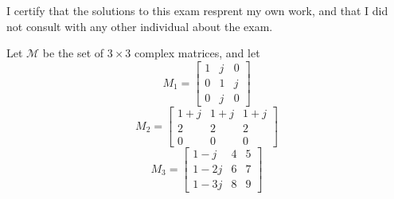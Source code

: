 \documentclass{exam}
\begin{document}
  I certify that the solutions to this exam resprent my own work, and that I did not consult with any other individual about the exam.
  \vspace*{50px}
  \begin{problem}
    Let $\mathcal{M}$ be the set of $3 \times 3$ complex matrices, and let
    \[
      M_1 = 
      \begin{bmatrix}
        1 & j & 0 \\
        0 & 1 & j \\
        0 & j & 0 
      \end{bmatrix}
    \]
    \[
      M_2 = 
      \begin{bmatrix}
        1 + j & 1 + j & 1 + j \\
        2 & 2 & 2 \\
        0 & 0 & 0
      \end{bmatrix}
    \]
    \[
      M_3 = 
      \begin{bmatrix}
        1 - j & 4 & 5 \\
        1 - 2j & 6 & 7 \\
        1 - 3j & 8 & 9
      \end{bmatrix}
    \]
  \end{problem}
\end{document}
